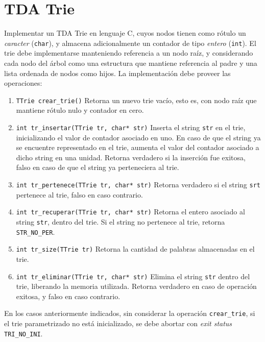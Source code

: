 \documentclass[12pt,a4paper]{article}
\begin{document}
\section{TDA Trie}

Implementar un TDA Trie en lenguaje C, cuyos nodos tienen como rótulo un \emph{caracter} (\texttt{char}), y almacena adicionalmente un contador de tipo \emph{entero} (\texttt{int}). El trie debe implementarse manteniendo referencia a un nodo raíz, y considerando cada nodo del árbol como una estructura que mantiene referencia al padre y una lista ordenada de nodos como hijos. La implementación debe proveer las operaciones:

\begin{enumerate}
	
	\item \texttt{TTrie crear\_trie()} Retorna un nuevo trie vacío, esto es, con nodo raíz que mantiene rótulo nulo y contador en cero.
	
	\item \texttt{int tr\_insertar(TTrie tr, char* str)} Inserta el string \texttt{str} en el trie, inicializando el valor de contador asociado en uno. En caso de que el string ya se encuentre representado en el trie, aumenta el valor del contador asociado a dicho string en una unidad. Retorna verdadero si la inserción fue exitosa, falso en caso de que el string ya perteneciera al trie.

	\item \texttt{int tr\_pertenece(TTrie tr, char* str)} Retorna verdadero si el string \texttt{srt} pertenece al trie, falso en caso contrario.
	
	\item \texttt{int tr\_recuperar(TTrie tr, char* str)} Retorna el entero asociado al string \texttt{str}, dentro del trie. Si el string no pertenece al trie, retorna \texttt{STR\_NO\_PER}.

	\item \texttt{int tr\_size(TTrie tr)} Retorna la cantidad de palabras almacenadas en el trie.
	
	\item \texttt{int tr\_eliminar(TTrie tr, char* str)} Elimina el string \texttt{str} dentro del trie, liberando la memoria utilizada. Retorna verdadero en caso de operación exitosa, y falso en caso contrario.
		
\end{enumerate}

En los casos anteriormente indicados, sin considerar la operación \texttt{crear\_trie}, si el trie parametrizado no está inicializado, se debe abortar con \emph{exit status} \texttt{TRI\_NO\_INI}. \\
\end{document}
